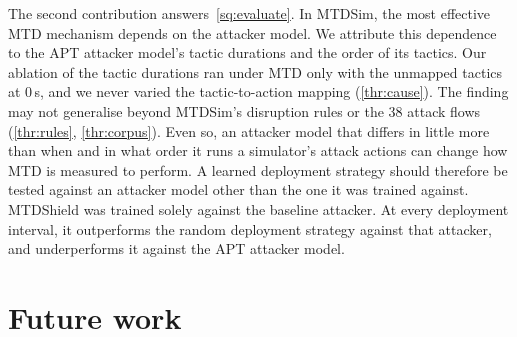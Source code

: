 \documentclass{cshonours}
\begin{document}
The second contribution answers~\ref{sq:evaluate}. In MTDSim, the most
effective MTD mechanism depends on the attacker model. We attribute this
dependence to the APT attacker model's tactic durations and the order of its
tactics. Our ablation of the tactic durations ran under MTD only with the
unmapped tactics at 0\,s, and we never varied the tactic-to-action mapping
(\ref{thr:cause}). The finding may not
generalise beyond MTDSim's disruption rules or the 38 attack flows
(\ref{thr:rules}, \ref{thr:corpus}). Even so, an attacker model that differs in
little more than when and in what order it runs a simulator's attack actions
can change how MTD is measured to perform. A learned deployment strategy should
therefore be tested against an attacker model other than the one it was
trained against. MTDShield was trained solely against the baseline attacker. At
every deployment interval, it outperforms the random deployment strategy
against that attacker, and underperforms it against the APT attacker model.

\section{Future work}
\label{sec:future-work}
\end{document}
